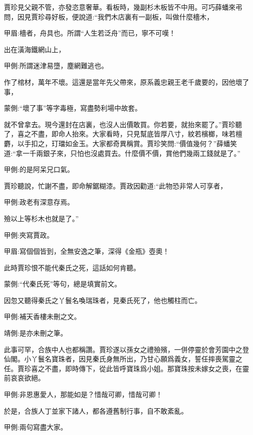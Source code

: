 \begin{parag}
    賈珍見父親不管，亦發恣意奢華。看板時，幾副杉木板皆不中用。可巧薛蟠來弔問，因見賈珍尋好板，便說道:“我們木店裏有一副板，叫做什麼檣木，\begin{note}甲眉:檣者，舟具也。所謂“人生若泛舟”而已，寧不可嘆！\end{note}出在潢海鐵網山上，\begin{note}甲側:所謂迷津易墮，塵網難逃也。\end{note}作了棺材，萬年不壞。這還是當年先父帶來，原系義忠親王老千歲要的，因他壞了事，\begin{note}蒙側:“壞了事”等字毒極，寫盡勢利場中故套。\end{note}就不曾拿去。現今還封在店裏，也沒人出價敢買。你若要，就抬來罷了。”賈珍聽了，喜之不盡，即命人抬來。大家看時，只見幫底皆厚八寸，紋若檳榔，味若檀麝，以手扣之，玎璫如金玉。大家都奇異稱賞。賈珍笑問:“價值幾何？”薛蟠笑道:“拿一千兩銀子來，只怕也沒處買去。什麼價不價，賞他們幾兩工錢就是了。”\begin{note}甲側:的是阿呆兄口氣。\end{note}賈珍聽說，忙謝不盡，即命解鋸糊漆。賈政因勸道:“此物恐非常人可享者，\begin{note}甲側:政老有深意存焉。\end{note}殮以上等杉木也就是了。”\begin{note}甲側:夾寫賈政。\end{note}\begin{note}甲眉:寫個個皆到，全無安逸之筆，深得《金瓶》壺奧！\end{note}此時賈珍恨不能代秦氏之死，這話如何肯聽。\begin{note}蒙側:“代秦氏死”等句，總是填實前文。\end{note}
\end{parag}


\begin{parag}
    因忽又聽得秦氏之丫鬟名喚瑞珠者，見秦氏死了，他也觸柱而亡。\begin{note}甲側:補天香樓未刪之文。\end{note}\begin{note}靖側:是亦未刪之筆。\end{note}此事可罕，合族中人也都稱讚。賈珍遂以孫女之禮殮殯，一併停靈於會芳園中之登仙閣。小丫鬟名寶珠者，因見秦氏身無所出，乃甘心願爲義女，誓任摔喪駕靈之任。賈珍喜之不盡，即時傳下，從此皆呼寶珠爲小姐。那寶珠按未嫁女之喪，在靈前哀哀欲絕。\begin{note}甲側:非恩惠愛人，那能如是？惜哉可卿，惜哉可卿！\end{note}於是，合族人丁並家下諸人，都各遵舊制行事，自不敢紊亂。\begin{note}甲側:兩句寫盡大家。\end{note}
\end{parag}


